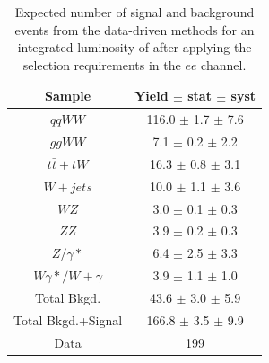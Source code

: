 \begin{table}[ht!]
  \begin{center}
  \begin{tabular} {|c|c|}
\hline
Sample                & Yield $\pm$ stat $\pm$ syst \\ \hline \hline
$qqWW$                & 116.0 $\pm$  1.7 $\pm$  7.6  \\ \hline
$ggWW$                &  7.1 $\pm$  0.2 $\pm$  2.2  \\ \hline
$t\bar{t} + tW$      & 16.3 $\pm$  0.8 $\pm$  3.1  \\ \hline
$W+jets$              & 10.0 $\pm$  1.1 $\pm$  3.6  \\ \hline
$WZ$             &  3.0 $\pm$  0.1 $\pm$  0.3  \\ \hline
$ZZ$             &  3.9 $\pm$  0.2 $\pm$  0.3  \\ \hline
$Z/\gamma*$          &  6.4 $\pm$  2.5 $\pm$  3.3  \\ \hline
$W\gamma*/W+\gamma$ &  3.9 $\pm$  1.1 $\pm$  1.0  \\ \hline \hline
Total Bkgd.           & 43.6 $\pm$  3.0 $\pm$  5.9  \\ \hline \hline
Total Bkgd.+Signal    & 166.8 $\pm$  3.5 $\pm$  9.9  \\ \hline \hline
Data                  & 199 \\ \hline
\end{tabular}
  \caption{Expected number of signal and background events from the data-driven methods for
  an integrated luminosity of \intlumi after applying the selection requirements in the $ee$ channel.}
   \label{tab:data_yields_ee}
  \end{center}
\end{table}

